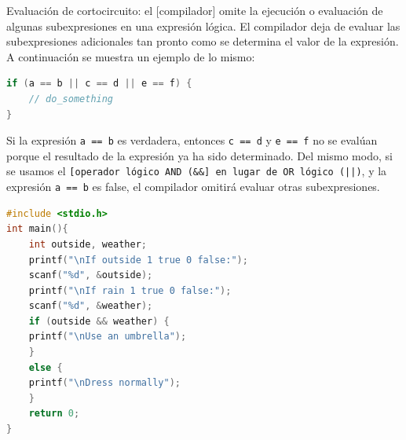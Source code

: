 \documentclass{article}
\begin{document}
Evaluación de cortocircuito: el [compilador] omite la ejecución o evaluación de algunas subexpresiones en una expresión lógica. El compilador deja de evaluar las subexpresiones adicionales tan pronto como se determina el valor de la expresión. A continuación se muestra un ejemplo de lo mismo:
\begin{lstlisting}[style=mystyle, language=C]
if (a == b || c == d || e == f) {
	// do_something
}
\end{lstlisting}
Si la expresión \texttt{a == b} es verdadera, entonces \texttt{c == d} y \texttt{e == f} no se evalúan porque el resultado de la expresión ya ha sido determinado. Del mismo modo, si se usamos el \texttt{[operador lógico AND (\&\&] en lugar de OR lógico (||)}, y la expresión \texttt{a == b} es false, el compilador omitirá evaluar otras subexpresiones.
\begin{lstlisting}[style=mystyle, language=C]
#include <stdio.h>
int main(){
	int outside, weather;
	printf("\nIf outside 1 true 0 false:");
	scanf("%d", &outside);
	printf("\nIf rain 1 true 0 false:");
	scanf("%d", &weather);
	if (outside && weather) {
	printf("\nUse an umbrella");
	}
	else {
	printf("\nDress normally");
	}
	return 0;
}
\end{lstlisting}
\end{document}
